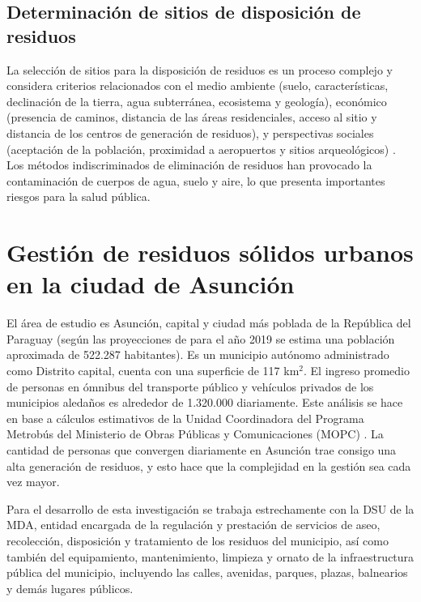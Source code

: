 \subsection{Determinación de sitios de disposición de residuos}

La selección de sitios para la disposición de residuos es un proceso complejo y considera criterios relacionados con el medio ambiente (suelo, características, declinación de la tierra, agua subterránea, ecosistema y geología), económico (presencia de caminos, distancia de las áreas residenciales, acceso al sitio y distancia de los centros de generación de residuos), y perspectivas sociales (aceptación de la población, proximidad a aeropuertos y sitios arqueológicos) \citep{Gbanie2013ModellingLeone}. Los métodos indiscriminados de eliminación de residuos han provocado la contaminación de cuerpos de agua, suelo y aire, lo que presenta importantes riesgos para la salud pública.

\section{Gestión de residuos sólidos urbanos en la ciudad de Asunción}

El área de estudio es Asunción, capital y ciudad más poblada de la República del Paraguay (según las proyecciones de \citet{2015Proyeccion2000-2025} para el año 2019 se estima una población aproximada de 522.287 habitantes). Es un municipio autónomo administrado como Distrito capital, cuenta con una superficie de 117 km$^{2}$. El ingreso promedio de personas en ómnibus del transporte público y vehículos privados de los municipios aledaños es alrededor de 1.320.000 diariamente. Este análisis se hace en base a cálculos estimativos de la Unidad Coordinadora del Programa Metrobús del Ministerio de Obras Públicas y Comunicaciones (MOPC) \citep{DiarioABCColor2016PorColor}. La cantidad de personas que convergen diariamente en Asunción trae consigo una alta generación de residuos, y esto hace que la complejidad en la gestión sea cada vez mayor.

Para el desarrollo de esta investigación se trabaja estrechamente con la DSU de la MDA, entidad encargada de la regulación y prestación de servicios de aseo, recolección, disposición y tratamiento de los residuos del municipio, así como también del equipamiento, mantenimiento, limpieza y ornato de la infraestructura pública del municipio, incluyendo las calles, avenidas, parques, plazas, balnearios y demás lugares públicos.

